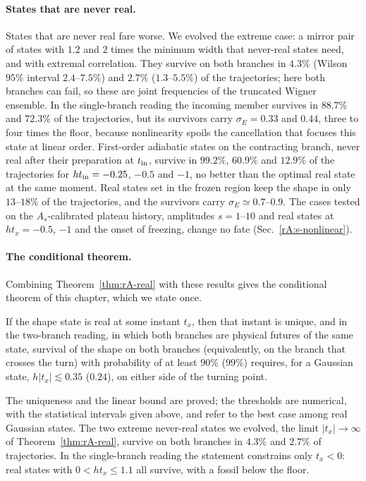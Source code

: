 \paragraph{States that are never real.}
States that are never real fare worse.
We evolved the extreme case: a mirror pair of states with $1.2$ and $2$ times the minimum width that never-real states need, and with extremal correlation. %
They survive on both branches in $4.3\%$ (Wilson $95\%$ interval $2.4$--$7.5\%$) and $2.7\%$ ($1.3$--$5.5\%$) of the trajectories; here both branches can fail, so these are joint frequencies of the truncated Wigner ensemble. %
In the single-branch reading the incoming member survives in $88.7\%$ and $72.3\%$ of the trajectories, but its survivors carry $\sigma_E=0.33$ and $0.44$, three to four times the floor, because nonlinearity spoils the cancellation that focuses this state at linear order. %
First-order adiabatic states on the contracting branch, never real after their preparation at $t_{\rm in}$, survive in $99.2\%$, $60.9\%$ and $12.9\%$ of the trajectories for $ht_{\rm in}=-0.25$, $-0.5$ and $-1$, no better than the optimal real state at the same moment. %
Real states set in the frozen region keep the shape in only $13$--$18\%$ of the trajectories, and the survivors carry $\sigma_E\simeq0.7$--$0.9$. %
The cases tested on the $A_s$-calibrated plateau history, amplitudes $s=1$--$10$ and real states at $ht_x=-0.5$, $-1$ and the onset of freezing, change no fate (Sec.~\ref{rA:s-nonlinear}). %

\paragraph{The conditional theorem.}
Combining Theorem~\ref{thm:rA-real} with these results gives the conditional theorem of this chapter, which we state once.

\begin{rAtheorem}\label{thm:rA-conditional}
If the shape state is real at some instant $t_x$, then that instant is unique, and in the two-branch reading, in which both branches are physical futures of the same state, survival of the shape on both branches (equivalently, on the branch that crosses the turn) with probability of at least $90\%$ ($99\%$) requires, for a Gaussian state, $h|t_x|\lesssim0.35$ ($0.24$), on either side of the turning point. %
\end{rAtheorem}

The uniqueness and the linear bound are proved; the thresholds are numerical, with the statistical intervals given above, and refer to the best case among real Gaussian states.
The two extreme never-real states we evolved, the limit $|t_x|\to\infty$ of Theorem~\ref{thm:rA-real}, survive on both branches in $4.3\%$ and $2.7\%$ of trajectories. %
In the single-branch reading the statement constrains only $t_x<0$: real states with $0<ht_x\leq1.1$ all survive, with a fossil below the floor. %

